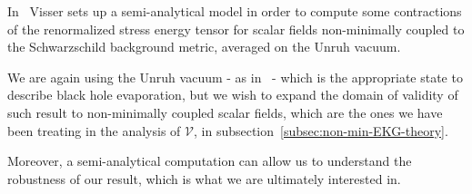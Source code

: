 In~\cite[]{visser1997gravitational} Visser sets up a semi-analytical model in order to compute some contractions of the renormalized stress energy tensor for scalar fields non-minimally coupled to the Schwarzschild background metric, averaged on the Unruh vacuum.

We are again using the Unruh vacuum - as in~\cite[]{levi2016versatile} - which is the appropriate state to describe black hole evaporation, but we wish to expand the domain of validity of such result to non-minimally coupled scalar fields, which are the ones we have been treating in the analysis of \(\mathcal{V}\), in subsection~\ref{subsec:non-min-EKG-theory}.

Moreover, a semi-analytical computation can allow us to understand the robustness of our result, which is what we are ultimately interested in.


